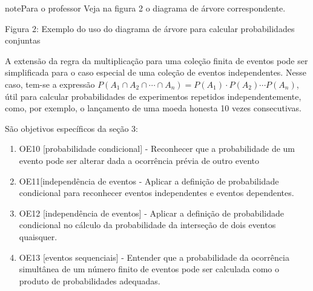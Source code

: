 \begin{sphinxadmonition}{note}{Para o professor}
Veja na figura 2 o diagrama de árvore correspondente.
\label{\detokenize{PE511-6:id1}}
\begin{figure}[H]
\centering

\noindent{}
\label{\detokenize{PE511-6:id1}}\end{figure}

Figura 2: Exemplo do uso do diagrama de árvore para calcular probabilidades conjuntas

A extensão da regra da multiplicação para uma coleção finita de eventos pode ser simplificada para o caso especial de uma coleção de eventos independentes. Nesse caso, tem-se a expressão
\(P(A_1\cap A_2\cap \cdots \cap A_n)=P(A_1)\cdot P(A_2)\cdots P(A_n)\),
útil para calcular probabilidades de experimentos repetidos independentemente, como, por exemplo, o lançamento de uma moeda honesta 10 vezes consecutivas.

São objetivos específicos da seção 3:
\begin{enumerate}
\item {} 
OE10 {[}probabilidade condicional{]} - Reconhecer que a probabilidade de um evento pode ser alterar dada a ocorrência prévia de outro evento

\item {} 
OE11{[}independência de eventos - Aplicar a definição de probabilidade condicional para reconhecer eventos independentes e eventos dependentes.

\item {} 
OE12 {[}independência de eventos{]} - Aplicar a definição de probabilidade condicional no cálculo da probabilidade da interseção de dois eventos quaisquer.

\item {} 
OE13 {[}eventos sequenciais{]} - Entender que a probabilidade da ocorrência simultânea de um número finito de eventos pode ser calculada como o produto de probabilidades adequadas.

\end{enumerate}
\end{sphinxadmonition}


